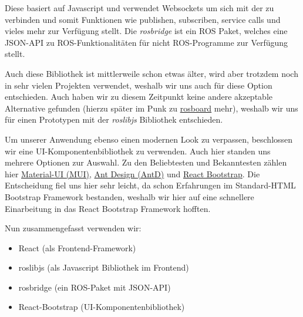 \begin{flushleft}
    Diese basiert auf Javascript und verwendet Websockets um sich mit der \cite[rosbridge]{rosbridgepackage} zu verbinden und somit Funktionen wie publishen, subscriben, service calls und vieles mehr zur Verfügung stellt. Die \textit{rosbridge} ist ein ROS Paket, welches eine JSON-API zu ROS-Funktionalitäten für nicht ROS-Programme zur Verfügung stellt.

    Auch diese Bibliothek ist mittlerweile schon etwas älter, wird aber trotzdem noch in sehr vielen Projekten verwendet, weshalb wir uns auch für diese Option entschieden. Auch haben wir zu diesem Zeitpunkt keine andere akzeptable Alternative gefunden (hierzu später im Punk zu \hyperlink{rosboard-target}{rosboard} mehr), weshalb wir uns für einen Prototypen mit der \textit{roslibjs} Bibliothek entschieden. 

    Um unserer Anwendung ebenso einen modernen Look zu verpassen, beschlossen wir eine UI-Komponentenbibliothek zu verwenden. Auch hier standen uns mehrere Optionen zur Auswahl. Zu den Beliebtesten und Bekanntesten zählen hier \href{https://mui.com}{Material-UI (MUI)}, \href{https://ant.design}{Ant Design (AntD)} und \href{https://react-bootstrap.github.io}{React Bootstrap}. Die Entscheidung fiel uns hier sehr leicht, da schon Erfahrungen im Standard-HTML Bootstrap Framework bestanden, weshalb wir hier auf eine schnellere Einarbeitung in das React Bootstrap Framework hofften.

    Nun zusammengefasst verwenden wir:
    \begin{itemize}
        \item React (als Frontend-Framework) \cite{reactframework}
        \item roslibjs (als Javascript Bibliothek im Frontend) \cite{roslibjs_robotwebtools}
        \item rosbridge (ein ROS-Paket mit JSON-API) \cite{rosbridgepackage}
        \item React-Bootstrap (UI-Komponentenbibliothek) \cite{reactbootstrap}
    \end{itemize}
\end{flushleft}